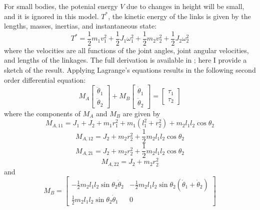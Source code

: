 \documentclass{jeb}
\begin{document}
	For small bodies, the potenial energy $V$ due to changes in height will be small, and it is ignored in this model.  $T^*$, the kinetic energy of the links is given by the lengths, masses, inertias, and instantaneous state:
\begin{equation}
T^* = \frac{1}{2}m_1 v_1^2 +
\frac{1}{2}J_1 \omega_1^2 +
\frac{1}{2}m_2 v_2^2 +
\frac{1}{2}J_2 \omega_2^2
\end{equation}
where the velocities are all functions of the joint angles, joint angular velocities, and lengths of the linkages.  The full derivation is available in  \citep{Baruh:2007};  here I provide a sketch of the result.  Applying Lagrange's equations results in the following second order differential equation:
\begin{equation}
M_A 
\left[ \begin{array}{c}
\ddot\theta_1 \\
\ddot\theta_2
\end{array} \right]
+ M_B 
\left[ \begin{array}{c}
\dot\theta_1 \\
\dot\theta_2
\end{array} \right]
=
\left[ \begin{array}{c}
\tau_1 \\
\tau_2
\end{array} \right]
\end{equation}
where the components of $M_A$ and $M_B$ are given by
\begin{equation}
M_{A,11} = J_1 + J_2 + m_1 r_1^2 + m_1 (l_1^2 + r_2^2) + m_2 l_1 l_2 \cos\theta_2
\end{equation}
\begin{equation}
M_{A,12} =J_2 + m_2 r_2^2 + \frac{1}{2}m_2 l_1 l_2 \cos\theta_2
\end{equation}
\begin{equation}
M_{A,21} =J_2 + m_2 r_2^2 + \frac{1}{2} m_2 l_1 l_2 \cos\theta_2
\end{equation}
\begin{equation}
M_{A,22} =J_2 + m_2 r_2^2
\end{equation}
and
\begin{equation}
M_{B} =
\left[\begin{array}{cc}
-\frac{1}{2} m_2 l_1 l_2 \sin\theta_2 \dot\theta_2 & 
-\frac{1}{2} m_2 l_1 l_2\sin\theta_2 (\dot\theta_1 + \dot\theta_2) \\
\frac{1}{2}m_2 l_1 l_2 \sin\theta_2\dot\theta_1 &
0
\end{array}\right]
\end{equation}
\end{document}
